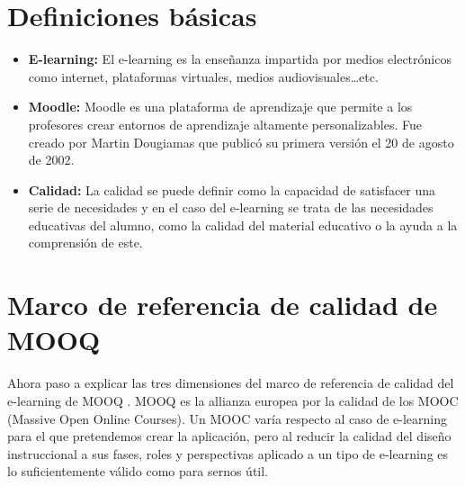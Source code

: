 

\section{Definiciones básicas}

\begin{itemize}
	\item \textbf{E-learning:}
	El e-learning es la enseñanza impartida por medios electrónicos como internet, plataformas virtuales, medios audiovisuales…etc.
	\item \textbf{Moodle:}
	Moodle es una plataforma de aprendizaje que permite a los profesores crear entornos de aprendizaje altamente personalizables. Fue creado por Martin Dougiamas que publicó su primera versión el 20 de agosto de 2002\cite{dougiamas2002interpretive}.
	\item \textbf{Calidad:}
	La calidad se puede definir como la capacidad de satisfacer una serie de necesidades y en el caso del e-learning se trata de las necesidades educativas del alumno, como la calidad del material educativo o la ayuda a la comprensión de este.
\end{itemize}

\section{Marco de referencia de calidad de MOOQ}
Ahora paso a explicar las tres dimensiones del marco de referencia de calidad del e-learning de MOOQ \cite{stracke2018quality}. MOOQ es la allianza europea por la calidad de los MOOC (Massive Open Online Courses). Un MOOC varía respecto al caso de e-learning para el que pretendemos crear la aplicación, pero al reducir la calidad del diseño instruccional a sus fases, roles y perspectivas aplicado a un tipo de e-learning es lo suficientemente válido como para sernos útil.
